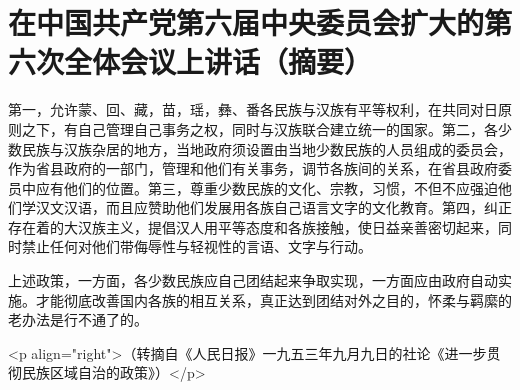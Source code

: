\section[在中国共产党第六届中央委员会扩大的第六次全体会议上讲话（摘要）（一九三八年十一月六日）]{在中国共产党第六届中央委员会扩大的第六次全体会议上讲话（摘要）}


第一，允许蒙、回、藏，苗，瑶，彝、番各民族与汉族有平等权利，在共同对日原则之下，有自己管理自己事务之权，同时与汉族联合建立统一的国家。第二，各少数民族与汉族杂居的地方，当地政府须设置由当地少数民族的人员组成的委员会，作为省县政府的一部门，管理和他们有关事务，调节各族间的关系，在省县政府委员中应有他们的位置。第三，尊重少数民族的文化、宗教，习惯，不但不应强迫他们学汉文汉语，而且应赞助他们发展用各族自己语言文字的文化教育。第四，纠正存在着的大汉族主义，提倡汉人用平等态度和各族接触，使日益亲善密切起来，同时禁止任何对他们带侮辱性与轻视性的言语、文字与行动。

上述政策，一方面，各少数民族应自己团结起来争取实现，一方面应由政府自动实施。才能彻底改善国内各族的相互关系，真正达到团结对外之目的，怀柔与羁縻的老办法是行不通了的。

<p align="right">（转摘自《人民日报》一九五三年九月九日的社论《进一步贯彻民族区域自治的政策》）</p>




